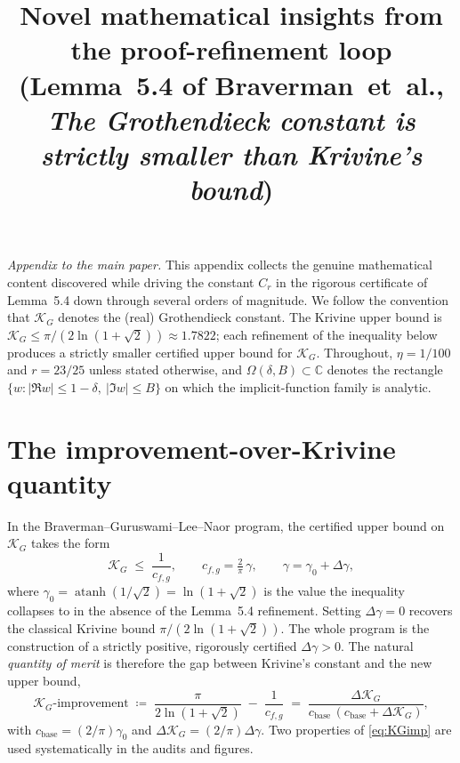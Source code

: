\documentclass[11pt]{article}
\title{Novel mathematical insights from the proof-refinement loop \\
       (Lemma~5.4 of Braverman~et~al., \emph{The Grothendieck constant is strictly smaller than Krivine's bound})}
\date{}
\theoremstyle{definition}
\newcommand{\C}{\mathbb{C}}
\newcommand{\KG}{\mathcal{K}_G}
\newcommand{\Om}{\Omega}
\begin{document}
\maketitle

\noindent\textit{Appendix to the main paper.}
This appendix collects the genuine mathematical content discovered while driving the
constant $C_r$ in the rigorous certificate of Lemma~5.4 down through several orders of
magnitude. We follow the convention that $\KG$ denotes the (real) Grothendieck constant.
The Krivine upper bound is $\KG \le \pi/(2\ln(1+\sqrt 2))\approx 1.7822$;
each refinement of the inequality below produces a strictly smaller certified upper
bound for $\KG$. Throughout, $\eta=1/100$ and $r=23/25$ unless stated otherwise, and
$\Om(\delta,B)\subset\C$ denotes the rectangle $\{w:|\Re w|\le 1-\delta,\ |\Im w|\le B\}$
on which the implicit-function family is analytic.

\bigskip

\section{The improvement-over-Krivine quantity}\label{sec:KG-quantity}

In the Braverman--Guruswami--Lee--Naor program, the certified upper bound on $\KG$
takes the form
\begin{equation}\label{eq:KG-bound}
   \KG \;\le\; \frac{1}{c_{f,g}}, \qquad
   c_{f,g} = \tfrac{2}{\pi}\,\gamma, \qquad
   \gamma = \gamma_0 + \Delta\gamma,
\end{equation}
where $\gamma_0=\operatorname{atanh}(1/\sqrt 2)=\ln(1+\sqrt 2)$ is the value the inequality
collapses to in the absence of the Lemma~5.4 refinement. Setting $\Delta\gamma = 0$ recovers
the classical Krivine bound $\pi/(2\ln(1+\sqrt 2))$. The whole program is the
construction of a strictly positive, rigorously certified $\Delta\gamma>0$. The natural
\emph{quantity of merit} is therefore the gap between Krivine's constant and the new
upper bound,
\begin{equation}\label{eq:KGimp}
   \KG\text{-improvement}
   \;\coloneqq\;
   \frac{\pi}{2\ln(1+\sqrt 2)} \;-\; \frac{1}{c_{f,g}}
   \;=\;
   \frac{\Delta\KG}{c_{\text{base}}\,(c_{\text{base}}+\Delta\KG)},
\end{equation}
with $c_{\text{base}}=(2/\pi)\gamma_0$ and $\Delta\KG=(2/\pi)\Delta\gamma$. Two
properties of \eqref{eq:KGimp} are used systematically in the audits and figures.
\end{document}
